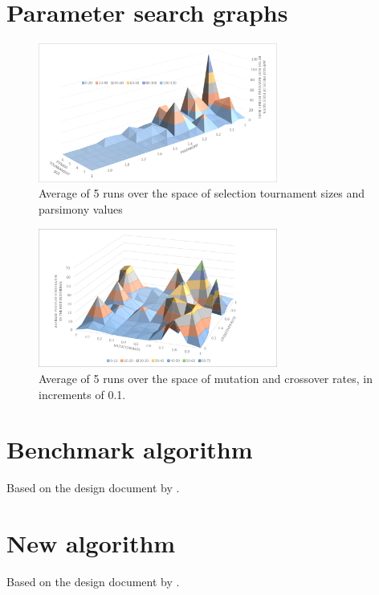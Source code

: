 \documentclass[british,10pt,a4paper]{article}
\begin{document}
\begin{appendices}
	\section{Parameter search graphs}
	\label{app:param_search}
	\begin{figure}[H]
		\centering
		\includegraphics[width=0.7\textwidth,keepaspectratio]{images/fitness_size_parsimony.png}
		\caption{Average of 5 runs over the space of selection tournament sizes and parsimony values}
		\label{fig:fitness_parsimony}
	\end{figure}
	\begin{figure}[H]
		\centering
		\includegraphics[width=0.7\textwidth,keepaspectratio]{images/cxpb_mutpb.png}
		\caption{Average of 5 runs over the space of mutation and crossover rates, in increments of 0.1.}
		\label{fig:mutpb_cxpb}
	\end{figure}
	\clearpage
	\section{Benchmark algorithm}\label{app:approach1}
	Based on the design document by \citet{Ehlis2000-sz}. \newline
	
  	\clearpage	

	\section{New algorithm}\label{app:approach4}
	Based on the design document by \citet{Ehlis2000-sz}. \newline
	
  	\clearpage	

\end{appendices}
\clearpage
\end{document}
